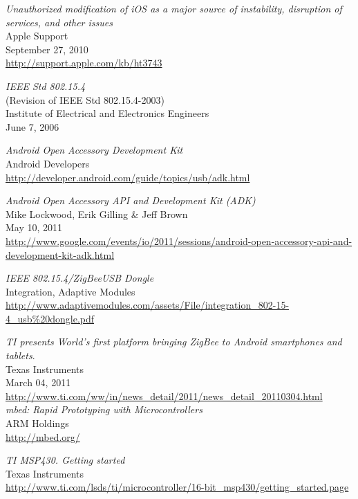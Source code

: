 \begin{thebibliography}{widest-label}
	\emph{Unauthorized modification of iOS as a major source of instability, disruption of services, and other issues}\\
	Apple Support\\
	September 27, 2010\\
	\url{http://support.apple.com/kb/ht3743}
	
	\emph{IEEE Std 802.15.4}\\
	(Revision of IEEE Std 802.15.4-2003)\\
	Institute of Electrical and Electronics Engineers\\
	June 7, 2006
	
	\emph{Android Open Accessory Development Kit}\\
	Android Developers\\
	\url{http://developer.android.com/guide/topics/usb/adk.html}
	
	\emph{Android Open Accessory API and Development Kit (ADK)}\\
	Mike Lockwood, Erik Gilling \& Jeff Brown\\
	May 10, 2011\\
	\url{http://www.google.com/events/io/2011/sessions/android-open-accessory-api-and-development-kit-adk.html}
	
	\emph{IEEE 802.15.4/ZigBee\texttrademark USB Dongle}\\
	Integration, Adaptive Modules\\
	\url{http://www.adaptivemodules.com/assets/File/integration_802-15-4_usb\%20dongle.pdf}	

	\emph{TI presents World’s first platform bringing ZigBee to Android smartphones and tablets}.\\
 	Texas Instruments\\
	March 04, 2011\\
 	\url{http://www.ti.com/ww/in/news_detail/2011/news_detail_20110304.html}\\
 	
	\emph{mbed: Rapid Prototyping with Microcontrollers}\\
	ARM Holdings\\
	\url{http://mbed.org/}
	
	\emph{TI MSP430. Getting started}\\
	Texas Instruments\\
	\url{http://www.ti.com/lsds/ti/microcontroller/16-bit_msp430/getting_started.page}
	

\end{thebibliography}
